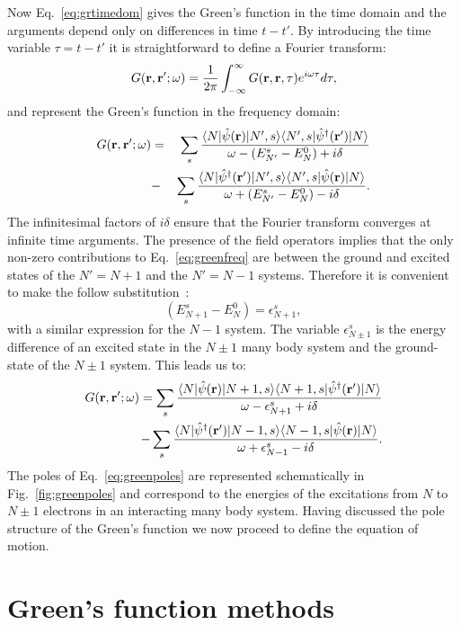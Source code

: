 %
Now Eq.~\ref{eq:grtimedom} gives the Green's function in the time domain and the arguments depend 
only on differences in time $t-t'$. By introducing the time variable $\tau = t-t'$ it is 
straightforward to define a Fourier transform:
%
\begin{equation}
G({\bf r},{\bf r}';\omega) = \frac{1}{2\pi} \int_{-\infty}^{\infty} G({\bf r},{\bf r},\tau) e^{i\omega\tau} d\tau,
\end{equation}
%
and represent the Green's function in the frequency domain:
%
\begin{eqnarray}
\label{eq:greenfreq}
G({\bf r},{\bf r^\prime};\omega) & = &\sum_{s} \frac{\langle N|\hat{\psi}({\bf r}) |N',s\rangle \langle N',s|\hat{\psi}^{\dagger}({\bf r}')| N \rangle}{\omega - (E^{s}_{N'} - E^{0}_{N}) + i\delta} \nonumber \\
	  		     & - & \sum_{s}\frac{\langle N|\hat{\psi}^{\dagger}({\bf r}') |N',s\rangle \langle N',s|\hat{\psi}({\bf r})| N \rangle}{\omega + (E^{s}_{N'} - E^{0}_{N}) - i\delta}.
\end{eqnarray}
%
The infinitesimal factors of $i\delta$ ensure that the Fourier 
transform converges at infinite time arguments.
The presence of the field operators implies that the only 
non-zero contributions to Eq.~\ref{eq:greenfreq} are between 
the ground and excited states of the $N'=N+1$ and the $N'=N-1$ systems. 
Therefore it is convenient to make the follow substitution~\cite{inkson86}:
%
\begin{equation}
(E^{s}_{N+1} - E^{0}_{N}) = \epsilon^{s}_{N+1},
\end{equation}
%
with a similar expression for the $N-1$ system. The variable $\epsilon^{s}_{N\pm1}$ 
is the energy difference of an excited state in the $N\pm1$ many body system and 
the ground-state of the $N\pm1$ system. 
This leads us to:
%
\begin{eqnarray}
\label{eq:greenpoles}
G({\bf r},{\bf r^\prime};\omega) = \sum_{s} \frac{\langle N|\hat{\psi}({\bf r}) |N+1,s\rangle \langle N+1,s|\hat{\psi}^{\dagger}({\bf r}')| N \rangle}{\omega - \epsilon^{s}_{N+1} + i\delta} \nonumber \\
			 		-\sum_{s} \frac{\langle N|\hat{\psi}^{\dagger}({\bf r}')|N-1,s\rangle \langle N-1,s|\hat{\psi}({\bf r})| N \rangle}{\omega + \epsilon^{s}_{N-1} - i\delta}.
\end{eqnarray}
%
The poles of Eq.~\ref{eq:greenpoles} are represented schematically in Fig.~\ref{fig:greenpoles} 
and correspond to the energies of the excitations from $N$ to $N\pm1$ electrons 
in an interacting many body system. Having discussed the pole structure of 
the Green's function we now proceed to define the equation of motion.

\section{Green's function methods}
\noindent
%
